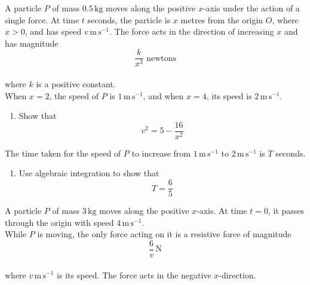 \documentclass[leqno]{article}
\begin{document}
\begin{enumerate}[
  label=\textbf{\arabic*.},
  leftmargin=*,
  topsep=0pt,
  partopsep=0pt,
  parsep=0pt
]
\newpage

\questionitem

A particle $P$ of mass $0.5\,\mathrm{kg}$ moves along the positive $x$-axis under the action of a single force. At time $t$ seconds, the particle is $x$ metres from the origin $O$, where $x>0$, and has speed $v\,\mathrm{m\,s^{-1}}$. The force acts in the direction of increasing $x$ and has magnitude
\[
\frac{k}{x^3}\text{ newtons}
\] \\
where $k$ is a positive constant. \\

When $x=2$, the speed of $P$ is $1\,\mathrm{m\,s^{-1}}$, and when $x=4$, its speed is $2\,\mathrm{m\,s^{-1}}$. \\

\begin{enumerate}[label=\textbf{(\alph*)}]
  \item Show that
  \[
  v^2=5-\frac{16}{x^2}
  \]
\end{enumerate}
The time taken for the speed of $P$ to increase from $1\,\mathrm{m\,s^{-1}}$ to $2\,\mathrm{m\,s^{-1}}$ is $T$ seconds. \\
\begin{enumerate}[label=\textbf{(\alph*)}, resume]
  \item Use algebraic integration to show that
  \[
  T=\frac{6}{5}
  \]
\end{enumerate}

\newpage

\questionitem

A particle $P$ of mass $3\,\mathrm{kg}$ moves along the positive $x$-axis. At time $t=0$, it passes through the origin with speed $4\,\mathrm{m\,s^{-1}}$. \\

While $P$ is moving, the only force acting on it is a resistive force of magnitude
\[
\frac{6}{v}\,\mathrm{N}
\] \\
where $v\,\mathrm{m\,s^{-1}}$ is its speed. The force acts in the negative $x$-direction. \\


\end{enumerate}
\end{document}
